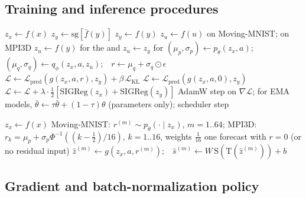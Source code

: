 \subsection{Training and inference procedures}

\begin{algorithm}[htbp]
\caption{One training update. The MPI3D arguments ($a$) are omitted on Moving-MNIST.}
\label{alg:train}
\small
\begin{algorithmic}[1]
\State $z_x\gets f(x)$ 
 \State $z_y\gets\mathrm{sg}[\bar f(y)]$ 
\Else \State $z_y\gets f(y)$ 
\EndIf
{}
  \State $z_u\gets f(u)$ on Moving-MNIST; on MPI3D $z_u\gets f(y)$ for the \emavar{} and $z_u\gets z_y$ for \shvar{}
  \State $(\mu_p,\sigma_p)\gets p_\theta(z_x,a)$;\ \ $(\mu_q,\sigma_q)\gets q_\phi(z_x,a,z_u)$;\ \ $r\gets\mu_q+\sigma_q\odot\epsilon$
  \State $\mathcal L\gets\mathcal L_{\mathrm{pred}}(g(z_x,a,r),z_y)+\beta\,\mathcal L_{\mathrm{KL}}$
\Else \State $\mathcal L\gets\mathcal L_{\mathrm{pred}}(g(z_x,a,0),z_y)$ 
\EndIf
{} \State $\mathcal L\gets\mathcal L+\lambda\cdot\frac12[\mathrm{SIGReg}(z_x)+\mathrm{SIGReg}(z_y)]$ \EndIf
\State AdamW step on $\nabla\mathcal L$; for EMA models, $\bar\theta\gets\tau\bar\theta+(1-\tau)\theta$ (parameters only); scheduler step
\end{algorithmic}
\end{algorithm}

\begin{algorithm}[htbp]
\caption{Forecast for one query (all modules in evaluation mode, parameters fixed).}
\label{alg:infer}
\small
\begin{algorithmic}[1]
\State $z_x\gets f(x)$
  \State Moving-MNIST: $r^{(m)}\sim p_\theta(\cdot\mid z_x)$, $m=1..64$; MPI3D: $r_k=\mu_p+\sigma_p\Phi^{-1}((k-\frac12)/16)$, $k=1..16$, weights $\frac1{16}$
\Else \State one forecast with $r=0$ (or no residual input)
\EndIf
\State $\hat z^{(m)}\gets g(z_x,a,r^{(m)})$;\ \ $\hat s^{(m)}\gets W\,\mathrm{S}(\mathrm{T}(\hat z^{(m)}))+b$ 
\end{algorithmic}
\end{algorithm}

\subsection{Gradient and batch-normalization policy}

